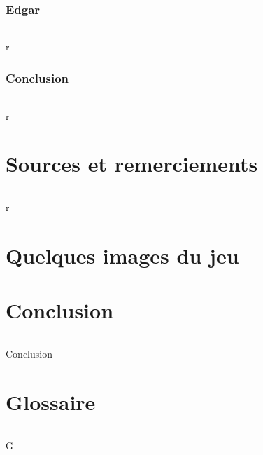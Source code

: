 \documentclass[titlepage, 13px, a4paper]{report}
\begin{document}
\newpage
\section{Edgar}
\paragraph{} \hspace{0pt}
r

\newpage
\section{Conclusion}
\paragraph{} \hspace{0pt}
r


\newpage


\part{Sources et remerciements}
\paragraph{} \hspace{0pt}
r


\newpage


\part{Quelques images du jeu}



\newpage


\part{Conclusion}
\paragraph{} \hspace{0pt}
Conclusion


\newpage


\part{Glossaire}
\paragraph{} \hspace{0pt}
G

\end{document}
